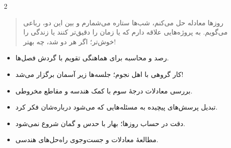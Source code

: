 \documentclass[11pt,a4paper,ragged2e,withhyper,rtl]{altacv}
\begin{document}
\makecvheader

\begin{paracol}{2}
\switchcolumn[1]

\begin{quote}
روزها معادله حل می‌کنم، شب‌ها ستاره می‌شمارم و بین این دو، رباعی می‌گویم.
به پروژه‌هایی علاقه دارم که یا زمان را دقیق‌تر کنند یا زندگی را خوش‌تر؛
اگر هر دو شد، چه بهتر!
\end{quote}

\begin{itemize}
  \item رصد و محاسبه برای هماهنگی تقویم با گردش فصل‌ها.
  \item کار گروهی با اهل نجوم؛ جلسه‌ها زیر آسمان برگزار می‌شد!
\end{itemize}
\divider

\begin{itemize}
  \item بررسی معادلات درجهٔ سوم با کمک هندسه و مقاطع مخروطی.
  \item تبدیل پرسش‌های پیچیده به مسئله‌هایی که می‌شود درباره‌شان فکر کرد.
\end{itemize}

\begin{itemize}
  \item دقت در حساب روزها؛ بهار با حدس و گمان شروع نمی‌شود.
\end{itemize}
\divider

\begin{itemize}
  \item مطالعهٔ معادلات و جست‌وجوی راه‌حل‌های هندسی.
\end{itemize}
\divider


\end{paracol}
\end{document}
